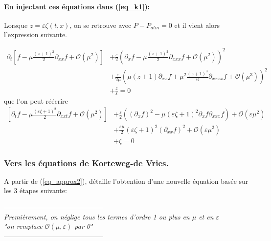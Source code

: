 \documentclass[12pt,a4paper]{article}
\numberwithin{equation}{section}
\begin{document}
\paragraph{En injectant ces équations dans (\ref{eq_k1}):} Lorsque $z = \varepsilon \zeta(t,x)$, on se retrouve avec $P -P_{atm} = 0$ et il vient alors l'expression suivante.

\begin{equation*}
\begin{split}
    \partial_{t}\left[f - \mu\frac{(z+1)^2}{2}\partial_{xx}f + \mathcal{O}(\mu^2)\right] 
    &+\frac{\varepsilon}{2}\left(\partial_xf - \mu\frac{(z+1)^2}{2}\partial_{xxx}f + \mathcal{O}(\mu^2)\right)^2 
     \\&+\frac{\varepsilon}{2\mu}\left(\mu(z+1)\partial_{xx}f + \mu^2\frac{(z+1)^3}{6}\partial_{xxxx}f + \mathcal{O}(\mu^3)\right)^2
     \\&+ \frac{z}{\varepsilon} 
     = 0
\end{split}
\end{equation*}
que l'on peut réécrire
\begin{equation}
\begin{split}
   \left[ \partial_{t}f - \mu\frac{(\varepsilon\zeta+1)^2}{2}\partial_{xxt}f + \mathcal{O}(\mu^2)\right] 
    &+\frac{\varepsilon}{2}\left(  (\partial_xf)^2 -  \mu(\varepsilon\zeta+1)^2 \partial_xf\partial_{xxx}f \right) + \mathcal{O}(\varepsilon\mu^2)   
     \\&+\frac{\varepsilon\mu}{2}(\varepsilon\zeta+1)^2(\partial_{xx}f)^2 +  \mathcal{O}(\varepsilon\mu^2) 
     \\&+  \zeta 
     = 0
\end{split}\label{eq_approx2} 
\end{equation}



\subsubsection{Vers les équations de Korteweg-de Vries.}
A partir de (\ref{eq_approx2}), \cite{MT} détaille l'obtention d'une nouvelle équation basée sur les 3 étapes suivante:
\begin{center}

    --------------------------------------------\\
   \textit{Premièrement, on néglige tous les termes d'ordre 1 ou plus en $\mu$ et en $\varepsilon$}\\
   \textit{"on remplace $\mathcal{O}(\mu,\varepsilon)$ par 0"}\\
   --------------------------------------------
\end{center}
\end{document}
